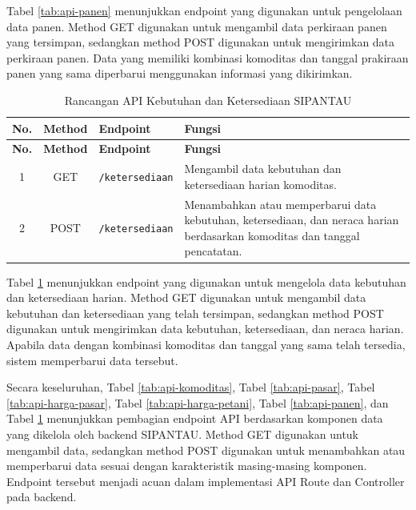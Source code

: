 Tabel \ref{tab:api-panen} menunjukkan endpoint yang digunakan untuk pengelolaan data panen. Method GET digunakan untuk mengambil data perkiraan panen yang tersimpan, sedangkan method POST digunakan untuk mengirimkan data perkiraan panen. Data yang memiliki kombinasi komoditas dan tanggal prakiraan panen yang sama diperbarui menggunakan informasi yang dikirimkan.

\begin{longtable}{|c|c|p{3.2cm}|p{6cm}|}
\caption{Rancangan API Kebutuhan dan Ketersediaan SIPANTAU}
\label{tab:api-ketersediaan} \\

\hline
\textbf{No.} & \textbf{Method} & \textbf{Endpoint} & \textbf{Fungsi} \\
\hline
\endfirsthead

\hline
\textbf{No.} & \textbf{Method} & \textbf{Endpoint} & \textbf{Fungsi} \\
\hline
\endhead

1 & GET & \texttt{/ketersediaan} &
Mengambil data kebutuhan dan ketersediaan harian komoditas. \\ \hline

2 & POST & \texttt{/ketersediaan} &
Menambahkan atau memperbarui data kebutuhan, ketersediaan, dan neraca harian berdasarkan komoditas dan tanggal pencatatan. \\ \hline

\end{longtable}

Tabel \ref{tab:api-ketersediaan} menunjukkan endpoint yang digunakan untuk mengelola data kebutuhan dan ketersediaan harian. Method GET digunakan untuk mengambil data kebutuhan dan ketersediaan yang telah tersimpan, sedangkan method POST digunakan untuk mengirimkan data kebutuhan, ketersediaan, dan neraca harian. Apabila data dengan kombinasi komoditas dan tanggal yang sama telah tersedia, sistem memperbarui data tersebut.

Secara keseluruhan, Tabel \ref{tab:api-komoditas}, Tabel \ref{tab:api-pasar}, Tabel \ref{tab:api-harga-pasar}, Tabel \ref{tab:api-harga-petani}, Tabel \ref{tab:api-panen}, dan Tabel \ref{tab:api-ketersediaan} menunjukkan pembagian endpoint API berdasarkan komponen data yang dikelola oleh backend SIPANTAU. Method GET digunakan untuk mengambil data, sedangkan method POST digunakan untuk menambahkan atau memperbarui data sesuai dengan karakteristik masing-masing komponen. Endpoint tersebut menjadi acuan dalam implementasi API Route dan Controller pada backend.

